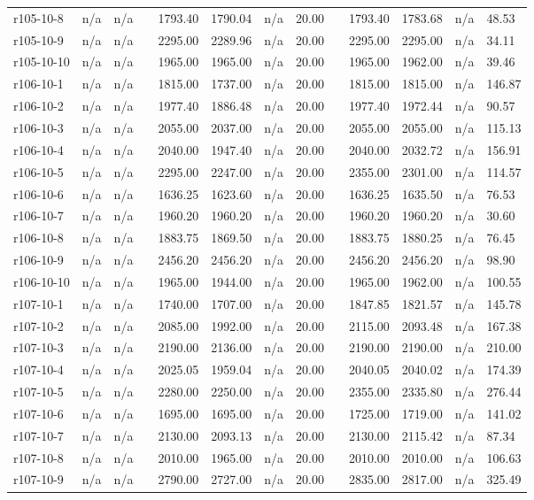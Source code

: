 \documentclass[final,5p,times,twocolumn]{elsarticle}
\begin{document}
{{{{{{{{{{{{{\begin{longtable}{l l l l l l l l l l l l l}
r105-10-8& n/a& n/a&&1793.40& 1790.04& n/a& 20.00&&1793.40& 1783.68& n/a& 48.53\\
r105-10-9& n/a& n/a&&2295.00& 2289.96& n/a& 20.00&&2295.00& 2295.00& n/a& 34.11\\
r105-10-10& n/a& n/a&&1965.00& 1965.00& n/a& 20.00&&1965.00& 1962.00& n/a& 39.46\\
r106-10-1& n/a& n/a&&1815.00& 1737.00& n/a& 20.00&&1815.00& 1815.00& n/a& 146.87\\
r106-10-2& n/a& n/a&&1977.40& 1886.48& n/a& 20.00&&1977.40& 1972.44& n/a& 90.57\\
r106-10-3& n/a& n/a&&2055.00& 2037.00& n/a& 20.00&&2055.00& 2055.00& n/a& 115.13\\
r106-10-4& n/a& n/a&&2040.00& 1947.40& n/a& 20.00&&2040.00& 2032.72& n/a& 156.91\\
r106-10-5& n/a& n/a&&2295.00& 2247.00& n/a& 20.00&&2355.00& 2301.00& n/a& 114.57\\
r106-10-6& n/a& n/a&&1636.25& 1623.60& n/a& 20.00&&1636.25& 1635.50& n/a& 76.53\\
r106-10-7& n/a& n/a&&1960.20& 1960.20& n/a& 20.00&&1960.20& 1960.20& n/a& 30.60\\
r106-10-8& n/a& n/a&&1883.75& 1869.50& n/a& 20.00&&1883.75& 1880.25& n/a& 76.45\\
r106-10-9& n/a& n/a&&2456.20& 2456.20& n/a& 20.00&&2456.20& 2456.20& n/a& 98.90\\
r106-10-10& n/a& n/a&&1965.00& 1944.00& n/a& 20.00&&1965.00& 1962.00& n/a& 100.55\\
r107-10-1& n/a& n/a&&1740.00& 1707.00& n/a& 20.00&&1847.85& 1821.57& n/a& 145.78\\
r107-10-2& n/a& n/a&&2085.00& 1992.00& n/a& 20.00&&2115.00& 2093.48& n/a& 167.38\\
r107-10-3& n/a& n/a&&2190.00& 2136.00& n/a& 20.00&&2190.00& 2190.00& n/a& 210.00\\
r107-10-4& n/a& n/a&&2025.05& 1959.04& n/a& 20.00&&2040.05& 2040.02& n/a& 174.39\\
r107-10-5& n/a& n/a&&2280.00& 2250.00& n/a& 20.00&&2355.00& 2335.80& n/a& 276.44\\
r107-10-6& n/a& n/a&&1695.00& 1695.00& n/a& 20.00&&1725.00& 1719.00& n/a& 141.02\\
r107-10-7& n/a& n/a&&2130.00& 2093.13& n/a& 20.00&&2130.00& 2115.42& n/a& 87.34\\
r107-10-8& n/a& n/a&&2010.00& 1965.00& n/a& 20.00&&2010.00& 2010.00& n/a& 106.63\\
r107-10-9& n/a& n/a&&2790.00& 2727.00& n/a& 20.00&&2835.00& 2817.00& n/a& 325.49\\

\end{longtable}}}}}}}}}}}}}}
\end{document}
